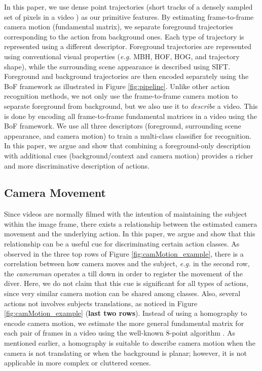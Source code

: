 \documentclass[runningheads]{llncs}
\begin{document}
In this paper, we use dense point trajectories (short tracks of a densely sampled set of pixels in a video \cite{wang2013}) as our primitive features. By estimating frame-to-frame camera motion (fundamental matrix), we separate foreground trajectories corresponding to the action from background ones. Each type of trajectory is represented using a different descriptor. Foreground trajectories are represented using conventional visual properties (\emph{e.g.} MBH, HOF, HOG, and trajectory shape), while the surrounding scene appearance is described using SIFT. Foreground and background trajectories are then encoded separately using the BoF framework as illustrated in Figure \ref{fig:pipeline}. Unlike other action recognition methods, we not only use the frame-to-frame camera motion to separate foreground from background, but we also use it to \emph{describe} a video. This is done by encoding all frame-to-frame fundamental matrices in a video using the BoF framework. We use all three descriptors (foreground, surrounding scene appearance, and camera motion) to train a multi-class classifier for recognition. In this paper, we argue and show that combining a foreground-only description \cite{wang2013} with additional cues (background/context and camera motion) provides a richer and more discriminative description of actions.
\subsection{Camera Movement}
\label{subsec:cam_motion}
Since videos are normally filmed with the intention of maintaining the subject within the image frame, there exists a relationship between the estimated camera movement and the underlying action. In this paper, we argue and show that this relationship can be a useful cue for discriminating certain action classes. As observed in the three top rows of Figure \ref{fig:camMotion_example}, there is a correlation between how camera moves and the subject, \emph{e.g.} in the second row, the \textit{cameraman} operates a till down in order to register the movement of the diver. Here, we do not claim that this cue is significant for all types of actions, since very similar camera motion can be shared among classes. Also, several actions not involves subjects translations, as noticed in Figure \ref{fig:camMotion_example} (\textbf{last two rows}). Instead of using a homography to encode camera motion, we estimate the more general fundamental matrix for each pair of frames in a video using the well-known 8-point algorithm \cite{eightpoint97}. As mentioned earlier, a homography is suitable to describe camera motion when the camera is not translating or when the background is planar; however, it is not applicable in more complex or cluttered scenes.
\end{document}
